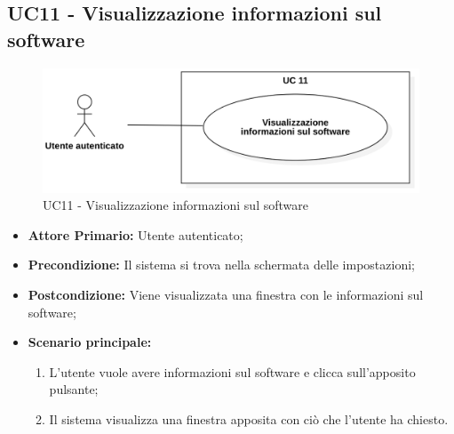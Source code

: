 \subsection{UC11 - Visualizzazione informazioni sul software}
\begin{figure}[H]
    \centering
    \includegraphics[scale = 0.7]{components/img/UC11.png}
    \caption{UC11 - Visualizzazione informazioni sul software}
\end{figure}
\begin{itemize}
\item \textbf{Attore Primario:} Utente autenticato;
\item \textbf{Precondizione:} Il sistema si trova nella schermata delle impostazioni;
\item \textbf{Postcondizione:} Viene visualizzata una finestra con le informazioni sul software;
\item \textbf{Scenario principale:}
    \begin{enumerate}
    \item L'utente vuole avere informazioni sul software e clicca sull'apposito pulsante;
    \item Il sistema visualizza una finestra apposita con ciò che l'utente ha chiesto.
    \end{enumerate}
\end{itemize}
